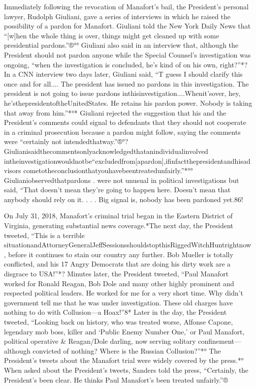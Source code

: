 Immediately following the revocation of Manafort's bail, the President's personal lawyer, Rudolph Giuliani, gave a series of interviews in which he raised the possibility of a pardon for Manafort. Giuliani told the New York Daily News that “[w]hen the whole thing is over, things might get cleaned up with some presidential pardons.”®°° Giuliani also said in an interview that, although the President should not pardon anyone while the Special Counsel's investigation was ongoing, “when the investigation is concluded, he's kind of on his own, right?”*? In a CNN interview two days later, Giuliani said, “T guess I should clarify this once and for all.... The president has issued no pardons in this investigation. The president is not going to issue pardons inthisinvestigation....Whenit'sover, hey, he'sthepresidentoftheUnitedStates. He retains his pardon power. Nobody is taking that away from him.”*°* Giuliani rejected the suggestion that his and the President's comments could signal to defendants that they should not cooperate in a criminal prosecution because a pardon might follow, saying the comments were “certainly not intendedthatway.”®°? Giulianisaidthecommentsonlyacknowledgedthatanindividualinvolved intheinvestigationwouldnotbe“excludedfrom[apardon],ifinfactthepresidentandhisadvisors
cometotheconclusionthatyouhavebeentreatedunfairly.”*°° Giulianiobservedthatpardons
.
were not unusual in political investigations but said, “That doesn't mean they're going to happen here. Doesn't mean that anybody should rely on it. . . . Big signal is, nobody has been pardoned yet.86!

On July 31, 2018, Manafort's criminal trial began in the Eastern District of Virginia, generating substantial news coverage.*The next day, the President tweeted, “This is a terrible situationandAttorneyGeneralJeffSessionsshouldstopthisRiggedWitchHuntrightnow, before it continues to stain our country any further. Bob Mueller is totally conflicted, and his 17 Angry Democrats that are doing his dirty work are a disgrace to USA!”*? Minutes later, the President tweeted, “Paul Manafort worked for Ronald Reagan, Bob Dole and many other highly prominent and respected political leaders. He worked for me for a very short time. Why didn't government tell me that he was under investigation. These old charges have nothing to do with Collusion—a Hoax!”8* Later in the day, the President tweeted, “Looking back on history, who was treated worse, Alfonse Capone, legendary mob boss, killer and ‘Public Enemy Number One,' or Paul Manafort, political operative & Reagan/Dole darling, now serving solitary confinement—although convicted of nothing? Where is the Russian Collusion?”*° The President's tweets about the Manafort trial were widely covered by the press.*° When asked about the President's tweets, Sanders told the press, “Certainly, the President's been clear. He thinks Paul Manafort's been treated unfairly.”®%

